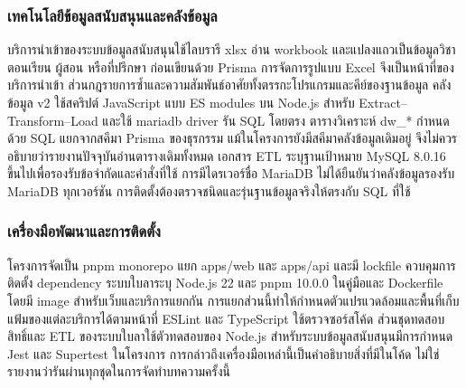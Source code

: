 \subsubsection{เทคโนโลยีข้อมูลสนับสนุนและคลังข้อมูล}
บริการนำเข้าของระบบข้อมูลสนับสนุนใช้ไลบรารี xlsx อ่าน workbook และแปลงแถวเป็นข้อมูลวิชา ตอนเรียน ผู้สอน หรือที่ปรึกษา ก่อนเขียนด้วย Prisma การจัดการรูปแบบ Excel จึงเป็นหน้าที่ของบริการนำเข้า ส่วนกฎรายการซ้ำและความสัมพันธ์อาศัยทั้งตรรกะโปรแกรมและคีย์ของฐานข้อมูล
คลังข้อมูล v2 ใช้สคริปต์ JavaScript แบบ ES modules บน Node.js สำหรับ Extract--Transform--Load และใช้ mariadb driver รัน SQL โดยตรง ตารางวิเคราะห์ dw\_* กำหนดด้วย SQL แยกจากสคีมา Prisma ของธุรกรรม แม้ในโครงการยังมีสคีมาคลังข้อมูลเดิมอยู่ จึงไม่ควรอธิบายว่ารายงานปัจจุบันอ่านตารางเดิมทั้งหมด
เอกสาร ETL ระบุฐานเป้าหมาย MySQL 8.0.16 ขึ้นไปเพื่อรองรับข้อจำกัดและคำสั่งที่ใช้ การมีไดรเวอร์ชื่อ MariaDB ไม่ได้ยืนยันว่าคลังข้อมูลรองรับ MariaDB ทุกเวอร์ชัน การติดตั้งต้องตรวจชนิดและรุ่นฐานข้อมูลจริงให้ตรงกับ SQL ที่ใช้
\subsubsection{เครื่องมือพัฒนาและการติดตั้ง}
โครงการจัดเป็น pnpm monorepo แยก apps/web และ apps/api และมี lockfile ควบคุมการติดตั้ง dependency ระบบใบลาระบุ Node.js 22 และ pnpm 10.0.0 ในคู่มือและ Dockerfile โดยมี image สำหรับเว็บและบริการแยกกัน การแยกส่วนนี้ทำให้กำหนดตัวแปรแวดล้อมและพื้นที่เก็บแฟ้มของแต่ละบริการได้ตามหน้าที่
ESLint และ TypeScript ใช้ตรวจซอร์สโค้ด ส่วนชุดทดสอบสิทธิ์และ ETL ของระบบใบลาใช้ตัวทดสอบของ Node.js สำหรับระบบข้อมูลสนับสนุนมีการกำหนด Jest และ Supertest ในโครงการ การกล่าวถึงเครื่องมือเหล่านี้เป็นคำอธิบายสิ่งที่มีในโค้ด ไม่ใช่รายงานว่ารันผ่านทุกชุดในการจัดทำบทความครั้งนี้
